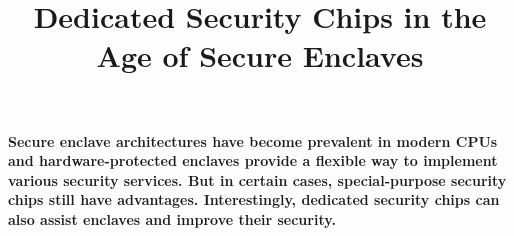 

\graphicspath{{images/}}

\title{Dedicated Security Chips in the Age of Secure Enclaves} 


\maketitle
\thispagestyle{empty}

{\bfseries
Secure enclave architectures have become prevalent in modern CPUs and hardware-protected enclaves provide a flexible way to implement various security services. But in certain cases, special-purpose security chips still have advantages. Interestingly, dedicated security chips can also assist enclaves and improve their security.}








{\small
%

}


